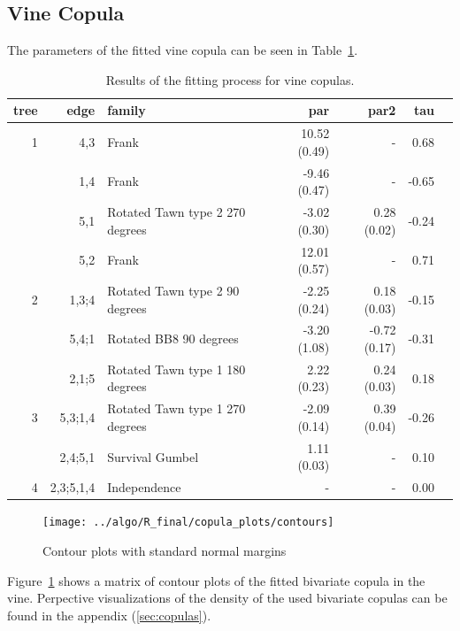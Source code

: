 \documentclass{article}
\begin{document}



\subsection{Vine Copula}
The parameters of the fitted vine copula can be seen in
Table~\ref{tab:vine}.

\begin{table}[h]
  \centering
  \footnotesize
  \begin{tabular}{rrlrrrr}
    \toprule
    tree & edge      & family                          & par          & par2         & tau   \\
    \midrule
    1    & 4,3       & Frank                           & 10.52 (0.49) & -            & 0.68  \\
         & 1,4       & Frank                           & -9.46 (0.47) & -            & -0.65 \\
         & 5,1       & Rotated Tawn type 2 270 degrees & -3.02 (0.30) & 0.28 (0.02)  & -0.24 \\
         & 5,2       & Frank                           & 12.01 (0.57) & -            & 0.71  \\
    2    & 1,3;4     & Rotated Tawn type 2 90 degrees  & -2.25 (0.24) & 0.18 (0.03)  & -0.15 \\
         & 5,4;1     & Rotated BB8 90 degrees          & -3.20 (1.08) & -0.72 (0.17) & -0.31 \\
         & 2,1;5     & Rotated Tawn type 1 180 degrees & 2.22 (0.23)  & 0.24 (0.03)  & 0.18  \\
    3    & 5,3;1,4   & Rotated Tawn type 1 270 degrees & -2.09 (0.14) & 0.39 (0.04)  & -0.26 \\
         & 2,4;5,1   & Survival Gumbel                 & 1.11 (0.03)  & -            & 0.10  \\
    4    & 2,3;5,1,4 & Independence                    & -            & -            & 0.00  \\
    \bottomrule
  \end{tabular}
  \caption{Results of the fitting process for vine copulas.}
  \label{tab:vine}
\end{table}
\begin{figure}[h]
  \centering
  \texttt{[image: ../algo/R\_final/copula\_plots/contours]}
  \caption{Contour plots with standard normal margins}
  \label{fig:contour}
\end{figure}
Figure~\ref{fig:contour} shows a matrix of
contour plots of the fitted bivariate copula in the vine.  Perpective
visualizations of the density of the used bivariate copulas can be
found in the appendix (\ref{sec:copulas}).
     
\end{document}
